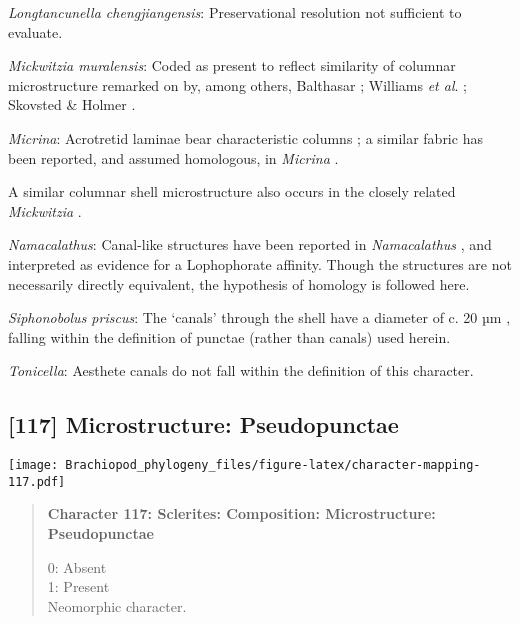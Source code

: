\documentclass[openany]{book}
\theoremstyle{definition}
\theoremstyle{definition}
\theoremstyle{definition}
\theoremstyle{remark}
\begin{document}
\hypertarget{Longtancunella_chengjiangensis-coding-116}{}
\emph{Longtancunella chengjiangensis}: Preservational resolution not
sufficient to evaluate.

\hypertarget{Mickwitzia_muralensis-coding-116}{}
\emph{Mickwitzia muralensis}: Coded as present to reflect similarity of
columnar microstructure remarked on by, among others, Balthasar
\citeyearpar{Balthasar2008iMummpikia}; Williams \emph{et al}.
\citeyearpar{Williams2007Supplement}; Skovsted \& Holmer
\citeyearpar{Skovsted2003EarlyCambrian}.

\hypertarget{Micrina-coding-116}{}
\emph{Micrina}: Acrotretid laminae bear characteristic columns
\citep[e.g.][]{Zhang2016Epithelialcell}; a similar fabric has been
reported, and assumed homologous, in \emph{Micrina}
\citep{Butler2012ConstructingCambrian}.

A similar columnar shell microstructure also occurs in the closely
related \emph{Mickwitzia} \citep{Balthasar2008iMummpikia}.

\hypertarget{Namacalathus-coding-116}{}
\emph{Namacalathus}: Canal-like structures have been reported in
\emph{Namacalathus} \citep{Zhuravlev2015Ediacaranskeletal}, and
interpreted as evidence for a Lophophorate affinity. Though the
structures are not necessarily directly equivalent, the hypothesis of
homology is followed here.

\hypertarget{Siphonobolus_priscus-coding-116}{}
\emph{Siphonobolus priscus}: The `canals' through the shell have a
diameter of c. 20 µm \citep[text-fig. 2a]{Williams2004Chemicostructure},
falling within the definition of punctae (rather than canals) used
herein.

\hypertarget{Tonicella-coding-116}{}
\emph{Tonicella}: Aesthete canals do not fall within the definition of
this character.

\subsection*{{[}117{]} Microstructure:
Pseudopunctae}\label{microstructure-pseudopunctae}

\texttt{[image: Brachiopod\_phylogeny\_files/figure-latex/character-mapping-117.pdf]}

\begin{quote}
\textbf{Character 117: Sclerites: Composition: Microstructure:
Pseudopunctae}

0: Absent\\
1: Present\\
Neomorphic character.
\end{quote}
\end{document}
